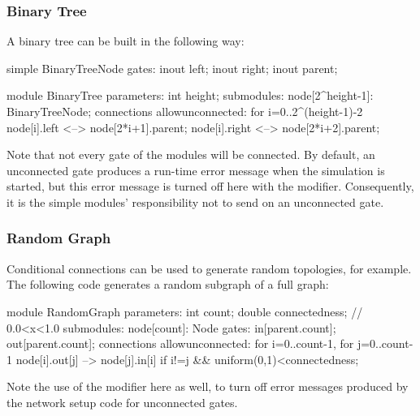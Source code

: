 \subsubsection{Binary Tree}
\label{sec:ned-lang:binary-tree-example}

A binary tree can be built in the following way:

\begin{ned}
simple BinaryTreeNode {
    gates:
        inout left;
        inout right;
        inout parent;
}

module BinaryTree {
    parameters:
        int height;
    submodules:
        node[2^height-1]: BinaryTreeNode;
    connections allowunconnected:
        for i=0..2^(height-1)-2 {
            node[i].left <--> node[2*i+1].parent;
            node[i].right <--> node[2*i+2].parent;
        }
}
\end{ned}

Note that not every gate of the modules will be connected. By default,
an unconnected gate produces a run-time error message when the
simulation is started, but this error message is turned off here with
the  modifier.
Consequently, it is the simple modules' responsibility not to send
on an unconnected gate.



\subsubsection{Random Graph}
\label{sec:ned-lang:random-graph-example}

Conditional connections can be used to generate random
topologies, for example. The following code
generates a random subgraph of a full graph:

\begin{ned}
module RandomGraph {
    parameters:
        int count;
        double connectedness; // 0.0<x<1.0
    submodules:
        node[count]: Node {
            gates:
                in[parent.count];
                out[parent.count];
        }
    connections allowunconnected:
        for i=0..count-1, for j=0..count-1 {
            node[i].out[j] --> node[j].in[i]
                if i!=j && uniform(0,1)<connectedness;
        }
}
\end{ned}

Note the use of the  modifier
here as well, to turn off error messages produced by the network setup code
for unconnected gates.


